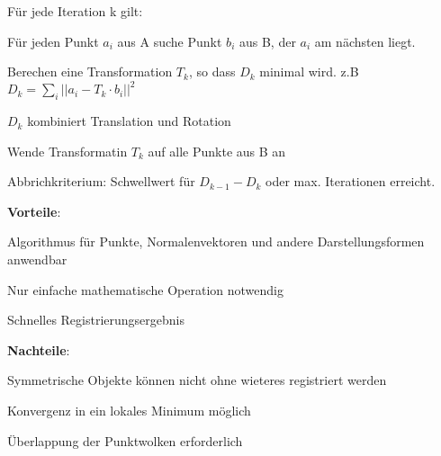 \begin{compactenum}
    \item Für jede Iteration k gilt:
    \begin{compactitem}
        \item Für jeden Punkt $a_i$ aus A suche Punkt $b_i$ aus B, der $a_i$ am nächsten
        liegt.
        \item Berechen eine Transformation $T_k$, so dass $D_k$ minimal wird. z.B
        $D_k = \sum_i || a_i - T_k \cdot b_i || ^2$
    \end{compactitem}
    \item $D_k$ kombiniert Translation und Rotation
    \item Wende Transformatin $T_k$ auf alle Punkte aus B an
    \item Abbrichkriterium: Schwellwert für $D_{k-1}-D_k$ oder max. Iterationen erreicht.
    \item \textbf{Vorteile}:
    \begin{compactitem}
        \item Algorithmus für Punkte, Normalenvektoren und andere Darstellungsformen
        anwendbar
        \item Nur einfache mathematische Operation notwendig
        \item Schnelles Registrierungsergebnis
    \end{compactitem}
    \item \textbf{Nachteile}:
    \item Symmetrische Objekte können nicht ohne wieteres registriert werden
    \item Konvergenz in ein lokales Minimum möglich
    \item Überlappung der Punktwolken erforderlich
\end{compactenum}

